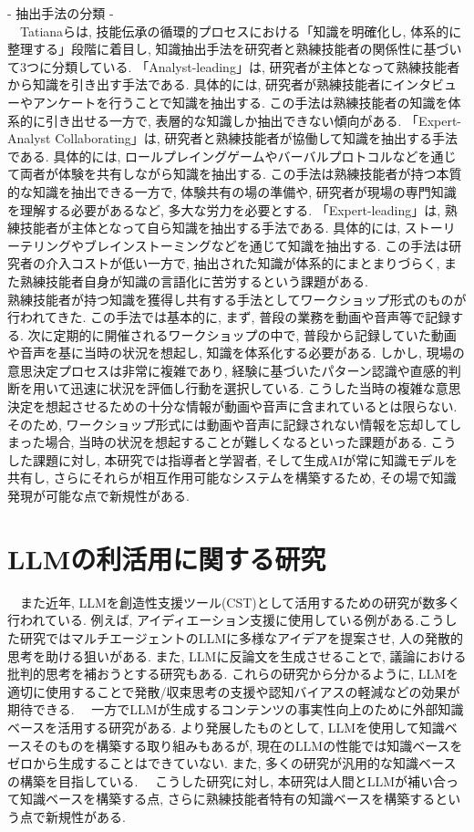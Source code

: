 - 抽出手法の分類 -\\
　Tatianaらは, 技能伝承の循環的プロセスにおける「知識を明確化し, 体系的に整理する」段階に着目し, 知識抽出手法を研究者と熟練技能者の関係性に基づいて3つに分類している\cite{Tatiana2012}.  「Analyst-leading」は, 研究者が主体となって熟練技能者から知識を引き出す手法である. 具体的には, 研究者が熟練技能者にインタビューやアンケートを行うことで知識を抽出する. この手法は熟練技能者の知識を体系的に引き出せる一方で, 表層的な知識しか抽出できない傾向がある. 「Expert-Analyst Collaborating」は, 研究者と熟練技能者が協働して知識を抽出する手法である. 具体的には, ロールプレイングゲームやバーバルプロトコルなどを通じて両者が体験を共有しながら知識を抽出する. この手法は熟練技能者が持つ本質的な知識を抽出できる一方で, 体験共有の場の準備や, 研究者が現場の専門知識を理解する必要があるなど, 多大な労力を必要とする. 「Expert-leading」は, 熟練技能者が主体となって自ら知識を抽出する手法である. 具体的には, ストーリーテリングやブレインストーミングなどを通じて知識を抽出する. この手法は研究者の介入コストが低い一方で, 抽出された知識が体系的にまとまりづらく, また熟練技能者自身が知識の言語化に苦労するという課題がある.\\
熟練技能者が持つ知識を獲得し共有する手法としてワークショップ形式のものが行われてきた\cite{Nishimura2017,Yoshida2022,Ijuin2022,Uchihira2022}. この手法では基本的に, まず, 普段の業務を動画や音声等で記録する. 次に定期的に開催されるワークショップの中で, 普段から記録していた動画や音声を基に当時の状況を想起し, 知識を体系化する必要がある. しかし, 現場の意思決定プロセスは非常に複雑であり, 経験に基づいたパターン認識や直感的判断を用いて迅速に状況を評価し行動を選択している\cite{Klein2008}. こうした当時の複雑な意思決定を想起させるための十分な情報が動画や音声に含まれているとは限らない. そのため, ワークショップ形式には動画や音声に記録されない情報を忘却してしまった場合, 当時の状況を想起することが難しくなるといった課題がある.
こうした課題に対し, 本研究では指導者と学習者, そして生成AIが常に知識モデルを共有し, さらにそれらが相互作用可能なシステムを構築するため, その場で知識発現が可能な点で新規性がある.

\section{LLMの利活用に関する研究}
　また近年, LLMを創造性支援ツール(CST)として活用するための研究が数多く行われている. 例えば, アイディエーション支援に使用している例がある\cite{Tanaka2024}.こうした研究ではマルチエージェントのLLMに多様なアイデアを提案させ, 人の発散的思考を助ける狙いがある. また, LLMに反論文を生成させることで, 議論における批判的思考を補おうとする研究もある\cite{Ozaki2024}. これらの研究から分かるように, LLMを適切に使用することで発散/収束思考の支援や認知バイアスの軽減などの効果が期待できる. 
　一方でLLMが生成するコンテンツの事実性向上のために外部知識ベースを活用する研究がある\cite{Welz2024, Lewis2020}. より発展したものとして, LLMを使用して知識ベースそのものを構築する取り組みもある\cite{Ukai2023}が, 現在のLLMの性能では知識ベースをゼロから生成することはできていない. また, 多くの研究が汎用的な知識ベースの構築を目指している.  
　こうした研究に対し, 本研究は人間とLLMが補い合って知識ベースを構築する点, さらに熟練技能者特有の知識ベースを構築するという点で新規性がある.

\cite{Nishimura2008}